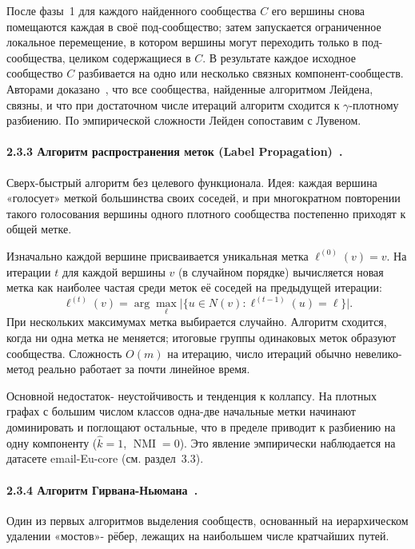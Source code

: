 \documentclass[14pt,a4paper]{extarticle}
\begin{document}
После фазы~1 для каждого найденного сообщества $C$ его вершины снова помещаются каждая в своё под-сообщество; затем запускается ограниченное локальное перемещение, в котором вершины могут переходить только в под-сообщества, целиком содержащиеся в $C$. В результате каждое исходное сообщество $C$ разбивается на одно или несколько связных компонент-сообществ. Авторами доказано~\cite{traag2019}, что все сообщества, найденные алгоритмом Лейдена, связны, и что при достаточном числе итераций алгоритм сходится к $\gamma$-плотному разбиению. По эмпирической сложности Лейден сопоставим с Лувеном.

\paragraph{2.3.3 Алгоритм распространения меток (Label Propagation)~\cite{raghavan2007}.} Сверх-быстрый алгоритм без целевого функционала. Идея: каждая вершина «голосует» меткой большинства своих соседей, и при многократном повторении такого голосования вершины одного плотного сообщества постепенно приходят к общей метке.

Изначально каждой вершине присваивается уникальная метка $\ell^{(0)}(v) = v$. На итерации $t$ для каждой вершины $v$ (в случайном порядке) вычисляется новая метка как наиболее частая среди меток её соседей на предыдущей итерации:
\begin{equation}
\ell^{(t)}(v) = \arg\max_{\ell} \bigl|\{u \in N(v) : \ell^{(t-1)}(u) = \ell\}\bigr|.
\end{equation}
При нескольких максимумах метка выбирается случайно. Алгоритм сходится, когда ни одна метка не меняется; итоговые группы одинаковых меток образуют сообщества. Сложность $O(m)$ на итерацию, число итераций обычно невелико- метод реально работает за почти линейное время.

Основной недостаток- неустойчивость и тенденция к коллапсу. На плотных графах с большим числом классов одна-две начальные метки начинают доминировать и поглощают остальные, что в пределе приводит к разбиению на одну компоненту ($\hat k = 1$, $\operatorname{NMI} = 0$). Это явление эмпирически наблюдается на датасете email-Eu-core (см. раздел~3.3).

\paragraph{2.3.4 Алгоритм Гирвана-Ньюмана~\cite{girvan2002}.} Один из первых алгоритмов выделения сообществ, основанный на иерархическом удалении «мостов»- рёбер, лежащих на наибольшем числе кратчайших путей.
\end{document}
